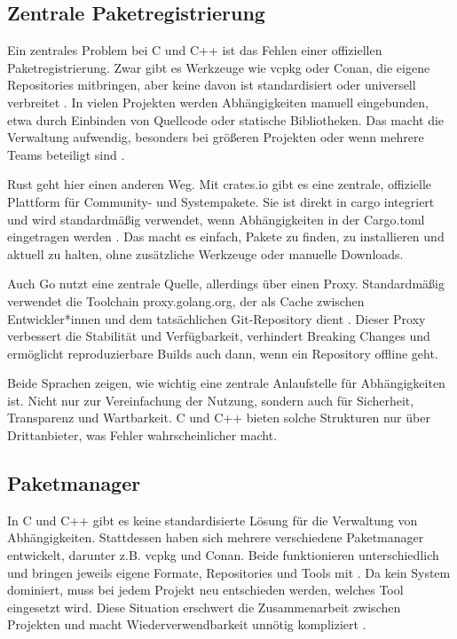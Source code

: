 \subsection{Zentrale Paketregistrierung}
\label{subsec:Zentrale_Paketregistrierung}

Ein zentrales Problem bei C und C++ ist das Fehlen einer offiziellen Paketregistrierung. 
Zwar gibt es Werkzeuge wie vcpkg oder Conan, die eigene Repositories mitbringen, 
aber keine davon ist standardisiert oder universell verbreitet \autocite{NotesPackageManagement}. 
In vielen Projekten werden Abhängigkeiten manuell eingebunden, etwa durch Einbinden von Quellcode 
oder statische Bibliotheken. Das macht die Verwaltung aufwendig, besonders bei größeren Projekten 
oder wenn mehrere Teams beteiligt sind \autocite{tangUnderstandingThirdpartyLibrary2022}.

Rust geht hier einen anderen Weg. Mit crates.io gibt es eine zentrale, offizielle Plattform 
für Community- und Systempakete. Sie ist direkt in cargo integriert und wird standardmäßig verwendet, 
wenn Abhängigkeiten in der Cargo.toml eingetragen werden \autocite{HelloCargoRust}. Das macht es einfach, 
Pakete zu finden, zu installieren und aktuell zu halten, ohne zusätzliche Werkzeuge oder manuelle Downloads.

Auch Go nutzt eine zentrale Quelle, allerdings über einen Proxy. 
Standardmäßig verwendet die Toolchain proxy.golang.org, der als Cache zwischen Entwickler*innen 
und dem tatsächlichen Git-Repository dient \autocite{GoModulesReference}. 
Dieser Proxy verbessert die Stabilität und Verfügbarkeit, verhindert Breaking Changes 
und ermöglicht reproduzierbare Builds auch dann, wenn ein Repository offline geht.

Beide Sprachen zeigen, wie wichtig eine zentrale Anlaufstelle für Abhängigkeiten ist. 
Nicht nur zur Vereinfachung der Nutzung, sondern auch für Sicherheit, Transparenz und Wartbarkeit. 
C und C++ bieten solche Strukturen nur über Drittanbieter, was Fehler wahrscheinlicher macht.

\subsection{Paketmanager}
\label{subsec:Paketmanager}

In C und C++ gibt es keine standardisierte Lösung für die Verwaltung von Abhängigkeiten. 
Stattdessen haben sich mehrere verschiedene Paketmanager entwickelt, darunter z.B. vcpkg und Conan. 
Beide funktionieren unterschiedlich und bringen jeweils eigene Formate, 
Repositories und Tools mit \autocite{NotesPackageManagement}. Da kein System dominiert, 
muss bei jedem Projekt neu entschieden werden, welches Tool eingesetzt wird. 
Diese Situation erschwert die Zusammenarbeit zwischen Projekten und macht Wiederverwendbarkeit 
unnötig kompliziert \autocite{tangUnderstandingThirdpartyLibrary2022}.

